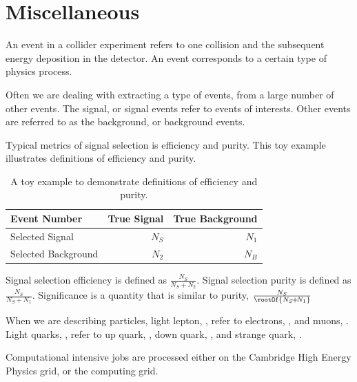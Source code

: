 \section{Miscellaneous}

An event in a collider experiment refers to one collision and the subsequent energy deposition in the detector. An event corresponds to a certain type of physics process.

Often we are dealing with extracting a type of events, from a large number of other events. The signal, or signal events refer to events of interests. Other events are referred to as the background, or background events.

Typical metrics of signal selection is efficiency and purity. This toy example illustrates definitions of efficiency and purity.

\begin{table}[!tbp]
\begin{tabular}{lrr}
\hline
\hline
Event Number  &  True Signal & True Background  \\
\hline
Selected Signal & $N_S$ & $N_1$ \\
Selected Background & $N_2$ & $N_B$ \\
\hline
\hline

\end{tabular}
\caption[A toy example to demonstrate definitions of efficiency and purity.]%
    {A toy example to demonstrate definitions of efficiency and purity.}
\label{tab:analysisToyExample}
\end{table}
Signal selection efficiency is defined as $\frac{N_S}{N_S \! + \! N_2}$. Signal selection purity is defined as $\frac{N_S}{N_S \! + \! N_1}$.
Significance is a quantity that is similar to purity, $\frac{N_S}{\rootOf{N_S \! + \! N_1}}$

When we are describing particles, light lepton, \llight, refer to electrons, \Pem, and muons, \Pmuon. Light quarks, \qlight, refer to up quark, \Pup, down quark, \Pdown, and strange quark, \Pstrange.

Computational intensive jobs are processed either on the Cambridge High Energy Physics grid, or the \CLIC computing grid.
